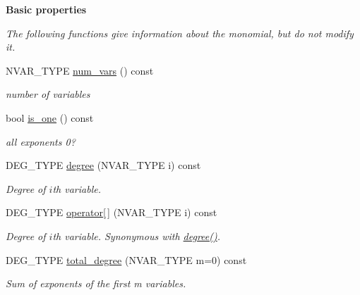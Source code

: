 \begin{Indent}\textbf{ Basic properties}\par
{\em The following functions give information about the monomial, but do not modify it. }\begin{DoxyCompactItemize}
\item 
\mbox{\label{group__polygroup_a4ade87fb2cae33669c66c7b23819ba57}} 
N\+V\+A\+R\+\_\+\+T\+Y\+PE \hyperlink{group__polygroup_a4ade87fb2cae33669c66c7b23819ba57}{num\+\_\+vars} () const
\begin{DoxyCompactList}\small\item\em number of variables \end{DoxyCompactList}\item 
\mbox{\label{group__polygroup_aa1508ad890693aee2f5c35e156f12e83}} 
bool \hyperlink{group__polygroup_aa1508ad890693aee2f5c35e156f12e83}{is\+\_\+one} () const
\begin{DoxyCompactList}\small\item\em all exponents 0? \end{DoxyCompactList}\item 
\mbox{\label{group__polygroup_a817508c95fe721c56c78d91975b8416b}} 
D\+E\+G\+\_\+\+T\+Y\+PE \hyperlink{group__polygroup_a817508c95fe721c56c78d91975b8416b}{degree} (N\+V\+A\+R\+\_\+\+T\+Y\+PE i) const
\begin{DoxyCompactList}\small\item\em Degree of $i$th variable. \end{DoxyCompactList}\item 
\mbox{\label{group__polygroup_ab3c18ba0fe7442e07d630bddea3469b5}} 
D\+E\+G\+\_\+\+T\+Y\+PE \hyperlink{group__polygroup_ab3c18ba0fe7442e07d630bddea3469b5}{operator\mbox{[}$\,$\mbox{]}} (N\+V\+A\+R\+\_\+\+T\+Y\+PE i) const
\begin{DoxyCompactList}\small\item\em Degree of $i$th variable. Synonymous with \hyperlink{group__polygroup_a817508c95fe721c56c78d91975b8416b}{degree()}. \end{DoxyCompactList}\item 
D\+E\+G\+\_\+\+T\+Y\+PE \hyperlink{group__polygroup_afe6df62857d9f58634d5f6c668f12d35}{total\+\_\+degree} (N\+V\+A\+R\+\_\+\+T\+Y\+PE m=0) const
\begin{DoxyCompactList}\small\item\em Sum of exponents of the first {\ttfamily m} variables. \end{DoxyCompactList}\item 

\end{DoxyCompactItemize}
\end{Indent}
